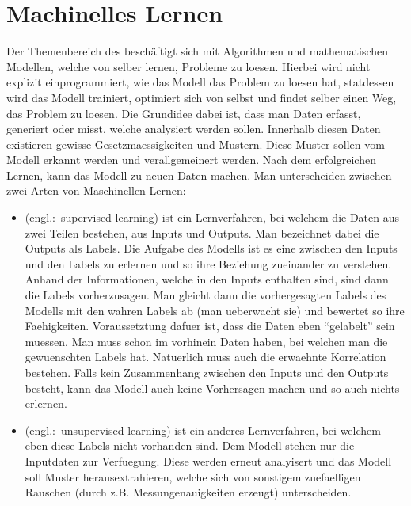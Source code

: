 \chapter{Machinelles Lernen}

Der Themenbereich des  beschäftigt sich mit Algorithmen und mathematischen Modellen, welche von selber lernen, Probleme zu loesen.
Hierbei wird nicht explizit einprogrammiert, wie das Modell das Problem zu loesen
hat, statdessen wird das Modell trainiert, optimiert sich von selbst und findet selber
einen Weg, das Problem zu loesen.
Die Grundidee dabei ist, dass man Daten erfasst, generiert oder misst, welche
analysiert werden sollen. Innerhalb diesen Daten existieren gewisse
Gesetzmaessigkeiten und Mustern. Diese Muster sollen vom Modell
erkannt werden und verallgemeinert werden. Nach dem erfolgreichen Lernen,
kann das Modell  zu neuen Daten machen.
\para{}
Man unterscheiden zwischen zwei Arten von Maschinellen Lernen:
\begin{itemize}
\item{
     (engl.:\ supervised learning) ist ein
    Lernverfahren, bei welchem die Daten aus zwei Teilen bestehen, aus Inputs und
    Outputs. Man bezeichnet dabei die Outputs als Labels. Die Aufgabe des Modells
    ist es eine  zwischen den Inputs und den Labels zu
    erlernen und so ihre Beziehung zueinander zu verstehen.
    Anhand der Informationen, welche in den Inputs enthalten
    sind, sind dann die Labels vorherzusagen. Man gleicht dann die
    vorhergesagten Labels des Modells mit den wahren Labels ab (man ueberwacht sie) und bewertet so ihre Faehigkeiten.
    \para{}
    Voraussetztung dafuer ist, dass die Daten eben ``gelabelt'' sein muessen.
    Man muss schon im vorhinein Daten haben, bei welchen man die gewuenschten
    Labels hat. Natuerlich muss auch die erwaehnte Korrelation bestehen. Falls
    kein Zusammenhang zwischen den Inputs und den Outputs besteht, kann das
    Modell auch keine Vorhersagen machen und so auch nichts erlernen.
  }
\item{
     (engl.:\ unsupervised learning) ist ein anderes
    Lernverfahren, bei welchem eben diese Labels nicht vorhanden sind. Dem
    Modell stehen nur die Inputdaten zur Verfuegung. Diese werden erneut analyisert
    und das Modell soll Muster herausextrahieren, welche sich von sonstigem
    zuefaelligen Rauschen (durch z.B. Messungenauigkeiten erzeugt)
    unterscheiden.
  }
\end{itemize}

